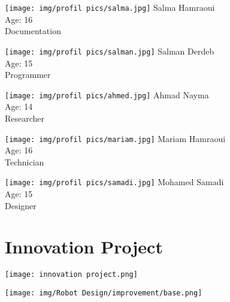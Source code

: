 \begin{minipage}[t]{0.15\textwidth}
    \centering
    \texttt{[image: img/profil pics/salma.jpg]} 
    {\scriptsize Salma Hamraoui} \\ 
    {\scriptsize Age: 16} \\ 
    {\scriptsize Documentation}
\end{minipage}
\hfill
\begin{minipage}[t]{0.15\textwidth}
    \centering
    \texttt{[image: img/profil pics/salman.jpg]} 
    {\scriptsize Salman Derdeb} \\ 
    {\scriptsize Age: 15} \\ 
    {\scriptsize Programmer}
\end{minipage}%
\hfill
\begin{minipage}[t]{0.15\textwidth}
    \centering
    \texttt{[image: img/profil pics/ahmed.jpg]} 
    {\scriptsize Ahmad Nayma} \\ 
    {\scriptsize Age: 14} \\ 
    {\scriptsize Researcher}
\end{minipage}%
\hfill
\begin{minipage}[t]{0.15\textwidth}
    \centering
    \texttt{[image: img/profil pics/mariam.jpg]} 
    {\scriptsize Mariam Hamraoui} \\ 
    {\scriptsize Age: 16} \\ 
    {\scriptsize Technician}
\end{minipage}
\hfill
\begin{minipage}[t]{0.15\textwidth}
    \centering
    \texttt{[image: img/profil pics/samadi.jpg]}
    {\scriptsize Mohamed Samadi} \\ 
    {\scriptsize Age: 15} \\ 
    {\scriptsize Designer}
\end{minipage}

\vspace{1cm}
\newpage



\chapter{Innovation Project}

\vfill 

\begin{center}
    \texttt{[image: innovation project.png]}
    \\ 
    
    \vspace{1cm} 

    \texttt{[image: img/Robot Design/improvement/base.png]} 
    \\ 
\end{center}

